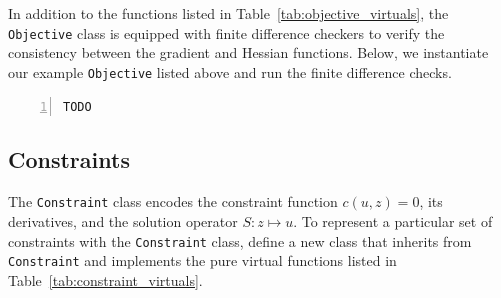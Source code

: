 \documentclass{article}
\begin{document}
In addition to the functions listed in Table~\ref{tab:objective_virtuals}, the \texttt{Objective} class is equipped with finite difference checkers to verify the consistency between the gradient and Hessian functions.
Below, we instantiate our example \texttt{Objective} listed above and run the finite difference checks.

\begin{lstlisting}[style=Matlab-editor,frame=single,numbers=left]
    TODO
\end{lstlisting}

\subsection*{Constraints}

The \texttt{Constraint} class encodes the constraint function $c(u, z) = 0$, its derivatives, and the solution operator $S:z\mapsto u$.
To represent a particular set of constraints with the \texttt{Constraint} class, define a new class that inherits from \texttt{Constraint} and implements the pure virtual functions listed in Table~\ref{tab:constraint_virtuals}.
\end{document}
